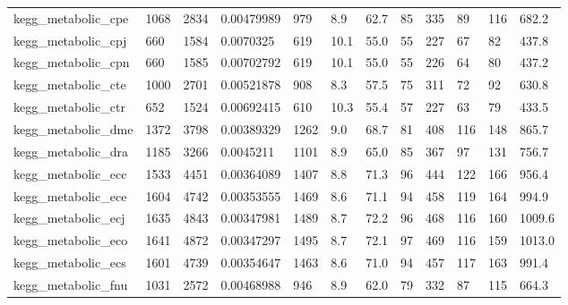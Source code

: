 \begin{longtable}{llllllllllll}
 kegg\_metabolic\_cpe                                 & 1068       & 2834      & 0.00479989  & 979   & 8.9    & 62.7   & 85    & 335    & 89     & 116    & 682.2   \\
 kegg\_metabolic\_cpj                                 & 660        & 1584      & 0.0070325   & 619   & 10.1   & 55.0   & 55    & 227    & 67     & 82     & 437.8   \\
 kegg\_metabolic\_cpn                                 & 660        & 1585      & 0.00702792  & 619   & 10.1   & 55.0   & 55    & 226    & 64     & 80     & 437.2   \\
 kegg\_metabolic\_cte                                 & 1000       & 2701      & 0.00521878  & 908   & 8.3    & 57.5   & 75    & 311    & 72     & 92     & 630.8   \\
 kegg\_metabolic\_ctr                                 & 652        & 1524      & 0.00692415  & 610   & 10.3   & 55.4   & 57    & 227    & 63     & 79     & 433.5   \\
 kegg\_metabolic\_dme                                 & 1372       & 3798      & 0.00389329  & 1262  & 9.0    & 68.7   & 81    & 408    & 116    & 148    & 865.7   \\
 kegg\_metabolic\_dra                                 & 1185       & 3266      & 0.0045211   & 1101  & 8.9    & 65.0   & 85    & 367    & 97     & 131    & 756.7   \\
 kegg\_metabolic\_ecc                                 & 1533       & 4451      & 0.00364089  & 1407  & 8.8    & 71.3   & 96    & 444    & 122    & 166    & 956.4   \\
 kegg\_metabolic\_ece                                 & 1604       & 4742      & 0.00353555  & 1469  & 8.6    & 71.1   & 94    & 458    & 119    & 164    & 994.9   \\
 kegg\_metabolic\_ecj                                 & 1635       & 4843      & 0.00347981  & 1489  & 8.7    & 72.2   & 96    & 468    & 116    & 160    & 1009.6  \\
 kegg\_metabolic\_eco                                 & 1641       & 4872      & 0.00347297  & 1495  & 8.7    & 72.1   & 97    & 469    & 116    & 159    & 1013.0  \\
 kegg\_metabolic\_ecs                                 & 1601       & 4739      & 0.00354647  & 1463  & 8.6    & 71.0   & 94    & 457    & 117    & 163    & 991.4   \\
 kegg\_metabolic\_fnu                                 & 1031       & 2572      & 0.00468988  & 946   & 8.9    & 62.0   & 79    & 332    & 87     & 115    & 664.3   \\

\end{longtable}
